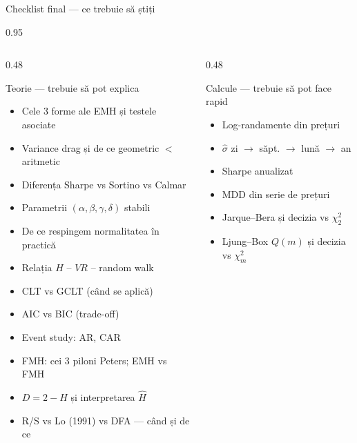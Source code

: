 \documentclass[9pt, aspectratio=169, t]{beamer}
\begin{document}
\begin{frame}[shrink=25]{Checklist final --- ce trebuie să știți}
\begin{cminipage}{0.95\textwidth}
\begin{columns}[T]
\begin{column}{0.48\textwidth}
\begin{block}{Teorie --- trebuie să pot explica}
\begin{itemize}\setlength{\itemsep}{0pt}
    \item[$\square$] Cele 3 forme ale EMH și testele asociate
    \item[$\square$] Variance drag și de ce geometric $<$ aritmetic
    \item[$\square$] Diferența Sharpe vs Sortino vs Calmar
    \item[$\square$] Parametrii $(\alpha, \beta, \gamma, \delta)$ stabili
    \item[$\square$] De ce respingem normalitatea în practică
    \item[$\square$] Relația $H$ -- $VR$ -- random walk
    \item[$\square$] CLT vs GCLT (când se aplică)
    \item[$\square$] AIC vs BIC (trade-off)
    \item[$\square$] Event study: AR, CAR
    \item[$\square$] FMH: cei 3 piloni Peters; EMH vs FMH
    \item[$\square$] $D = 2 - H$ și interpretarea $\hat H$
    \item[$\square$] R/S vs Lo (1991) vs DFA --- când și de ce
\end{itemize}
\end{block}
\end{column}
\begin{column}{0.48\textwidth}
\begin{block}{Calcule --- trebuie să pot face rapid}
\begin{itemize}\setlength{\itemsep}{0pt}
    \item[$\square$] Log-randamente din prețuri
    \item[$\square$] $\hat\sigma$ zi $\to$ săpt. $\to$ lună $\to$ an
    \item[$\square$] Sharpe anualizat
    \item[$\square$] MDD din serie de prețuri
    \item[$\square$] Jarque--Bera și decizia vs $\chi^2_2$
    \item[$\square$] Ljung--Box $Q(m)$ și decizia vs $\chi^2_m$

\end{itemize}
\end{block}
\end{column}
\end{columns}
\end{cminipage}
\end{frame}
\end{document}
